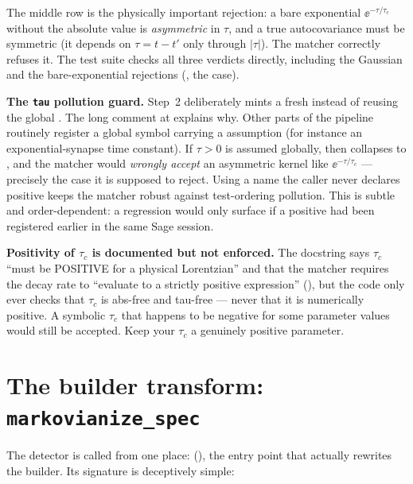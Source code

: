 The middle row is the physically important rejection: a bare exponential
$\ee^{-\tau/\tau_c}$ without the absolute value is \emph{asymmetric} in $\tau$,
and a true autocovariance must be symmetric (it depends on $\tau = t-t'$ only
through $|\tau|$). The matcher correctly refuses it. The test suite checks all
three verdicts directly, including the Gaussian and the bare-exponential
rejections (, the
 case).

\begin{gotcha}
\textbf{The \texttt{tau} pollution guard.} Step~2 deliberately mints a fresh
 instead of reusing the global . The long
comment at  explains why. Other
parts of the pipeline routinely register a global  symbol carrying a
 assumption (for instance an exponential-synapse time
constant). If $\tau > 0$ is assumed globally, then  collapses to
, and the matcher would \emph{wrongly accept} an asymmetric kernel like
$\ee^{-\tau/\tau_c}$ --- precisely the case it is supposed to reject. Using a name
the caller never declares positive keeps the matcher robust against
test-ordering pollution. This is subtle and order-dependent: a regression would
only surface if a positive  had been registered earlier in the same
Sage session.
\end{gotcha}

\begin{gotcha}
\textbf{Positivity of $\tau_c$ is documented but not enforced.} The docstring
says $\tau_c$ ``must be POSITIVE for a physical Lorentzian'' and that the matcher
requires the decay rate to ``evaluate to a strictly positive expression''
(), but the code only
ever checks that $\tau_c$ is abs-free and tau-free --- never that it is
numerically positive. A symbolic $\tau_c$ that happens to be negative for some
parameter values would still be accepted. Keep your $\tau_c$ a genuinely positive
parameter.
\end{gotcha}

\section{The builder transform: \texttt{markovianize\_spec}}\label{sec:cm-transform}

The detector is called from one place: 
(), the entry point that actually
rewrites the builder. Its signature is deceptively simple:

